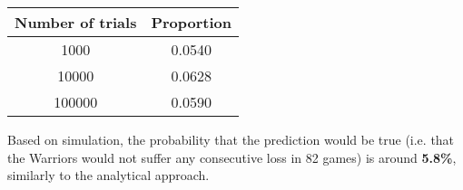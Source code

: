 \documentclass[12pt]{article}
\begin{document}
\begin{enumerate}
\begin{center}
\begin{tabular}{ c c } 
\hline
Number of trials & Proportion\\
\hline\hline
1000 & 0.0540 \\ 
10000 & 0.0628 \\ 
100000 & 0.0590 \\ 
\hline
\end{tabular}
\end{center}
Based on simulation, the probability that the prediction would be true (i.e. that the Warriors would not suffer any consecutive loss in 82 games) is around \textbf{5.8\%}, similarly to the analytical approach.

\end{enumerate}
\end{document}
